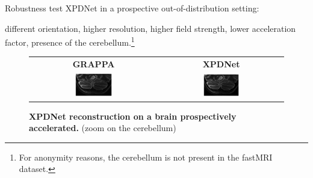 \begin{frame}{Robustness test}
    XPDNet in a prospective out-of-distribution setting:

    different orientation, higher resolution, higher field strength, lower acceleration factor, presence of the cerebellum.\footnote{For anonymity reasons, the cerebellum is not present in the fastMRI dataset.}

    \begin{figure}[h]
        \begin{center}
        \begin{tabular}{cc}
        \textbf{GRAPPA} & \textbf{XPDNet} \\
        \includegraphics[width=0.30\textwidth]{Figures/clinic_applic/gt_brain_7t_zoom.png}&
        \includegraphics[width=0.30\textwidth]{Figures/clinic_applic/brain_nn_recon_zoom.png}
        \end{tabular}
        \caption{\textbf{XPDNet reconstruction on a brain prospectively accelerated.} (zoom on the cerebellum) \label{fig:brain-7t}}
        \end{center}
    \end{figure}
\end{frame}

